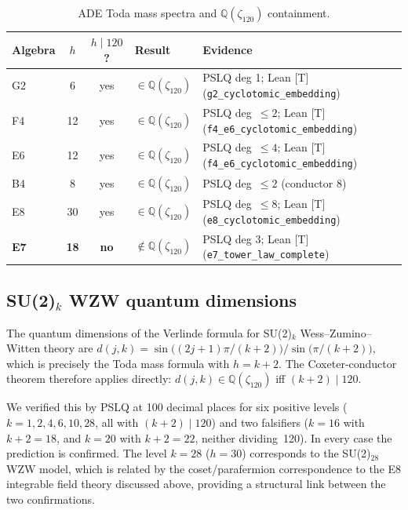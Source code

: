 \documentclass[11pt]{article}
\theoremstyle{remark}
\newcommand{\zetaN}[1]{\zeta_{#1}}
\begin{document}
\begin{table}[H]
\centering
\small
\renewcommand{\arraystretch}{1.1}
\begin{tabular}{@{}lccll@{}}
\toprule
\textbf{Algebra} & $h$ & $h\mid 120$? & \textbf{Result} & \textbf{Evidence} \\
\midrule
G2  & 6  & yes & $\in\mathbb{Q}(\zetaN{120})$ & PSLQ deg 1; Lean [T] (\texttt{g2\_cyclotomic\_embedding}) \\
F4  & 12 & yes & $\in\mathbb{Q}(\zetaN{120})$ & PSLQ deg~$\leq 2$; Lean [T] (\texttt{f4\_e6\_cyclotomic\_embedding}) \\
E6  & 12 & yes & $\in\mathbb{Q}(\zetaN{120})$ & PSLQ deg~$\leq 4$; Lean [T] (\texttt{f4\_e6\_cyclotomic\_embedding}) \\
B4  & 8  & yes & $\in\mathbb{Q}(\zetaN{120})$ & PSLQ deg~$\leq 2$ (conductor 8) \\
E8  & 30 & yes & $\in\mathbb{Q}(\zetaN{120})$ & PSLQ deg~$\leq 8$; Lean [T] (\texttt{e8\_cyclotomic\_embedding}) \\
\textbf{E7} & \textbf{18} & \textbf{no} &
  $\notin\mathbb{Q}(\zetaN{120})$ & PSLQ deg 3; Lean [T] (\texttt{e7\_tower\_law\_complete}) \\
\bottomrule
\end{tabular}
\caption{ADE Toda mass spectra and $\mathbb{Q}(\zetaN{120})$ containment.}
\label{tab:toda}
\end{table}

\subsection{\texorpdfstring{SU(2)$_k$ WZW quantum dimensions}{SU(2)k WZW quantum dimensions}}

The quantum dimensions of the Verlinde formula for SU(2)$_k$
Wess--Zumino--Witten theory are
$d(j,k) = \sin\bigl((2j+1)\pi/(k+2)\bigr)/\sin\bigl(\pi/(k+2)\bigr)$,
which is precisely the Toda mass formula with $h = k+2$.
The Coxeter-conductor theorem therefore applies directly:
$d(j,k) \in \mathbb{Q}(\zetaN{120})$ iff $(k+2)\mid 120$.

We verified this by PSLQ at 100 decimal places for six positive levels
($k = 1, 2, 4, 6, 10, 28$, all with $(k+2)\mid 120$) and two falsifiers
($k=16$ with $k+2=18$, and $k=20$ with $k+2=22$, neither dividing~120).
In every case the prediction is confirmed.
The level $k=28$ ($h=30$) corresponds to the SU(2)$_{28}$ WZW model, which is
related by the coset/parafermion correspondence to the E8 integrable field theory
discussed above, providing a structural link between the two confirmations.
\end{document}
